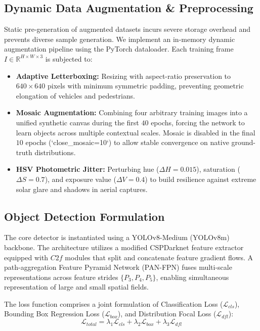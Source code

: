 \documentclass[conference]{IEEEtran}
\begin{document}
\subsection{Dynamic Data Augmentation \& Preprocessing}
Static pre-generation of augmented datasets incurs severe storage overhead and prevents diverse sample generation. We implement an in-memory dynamic augmentation pipeline using the PyTorch dataloader. Each training frame $I \in \mathbb{R}^{H \times W \times 3}$ is subjected to:
\begin{itemize}
    \item \textbf{Adaptive Letterboxing:} Resizing with aspect-ratio preservation to $640\times 640$ pixels with minimum symmetric padding, preventing geometric elongation of vehicles and pedestrians.
    \item \textbf{Mosaic Augmentation:} Combining four arbitrary training images into a unified synthetic canvas during the first $40$ epochs, forcing the network to learn objects across multiple contextual scales. Mosaic is disabled in the final $10$ epochs (`close\_mosaic=10`) to allow stable convergence on native ground-truth distributions.
    \item \textbf{HSV Photometric Jitter:} Perturbing hue ($\Delta H = 0.015$), saturation ($\Delta S = 0.7$), and exposure value ($\Delta V = 0.4$) to build resilience against extreme solar glare and shadows in aerial captures.
\end{itemize}

\subsection{Object Detection Formulation}
The core detector is instantiated using a YOLOv8-Medium (YOLOv8m) backbone. The architecture utilizes a modified CSPDarknet feature extractor equipped with $C2f$ modules that split and concatenate feature gradient flows. A path-aggregation Feature Pyramid Network (PAN-FPN) fuses multi-scale representations across feature strides $\{P_3, P_4, P_5\}$, enabling simultaneous representation of large and small spatial fields.

The loss function comprises a joint formulation of Classification Loss ($\mathcal{L}_{cls}$), Bounding Box Regression Loss ($\mathcal{L}_{box}$), and Distribution Focal Loss ($\mathcal{L}_{dfl}$):
\begin{equation}
\mathcal{L}_{total} = \lambda_1 \mathcal{L}_{cls} + \lambda_2 \mathcal{L}_{box} + \lambda_3 \mathcal{L}_{dfl}
\label{eq:total_loss}
\end{equation}
\end{document}
